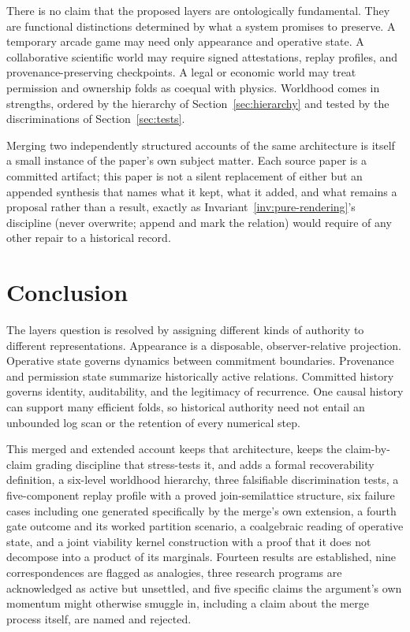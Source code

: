 \documentclass[11pt]{article}
\begin{document}
There is no claim that the proposed layers are ontologically fundamental. They are functional distinctions determined by what a system promises to preserve. A temporary arcade game may need only appearance and operative state. A collaborative scientific world may require signed attestations, replay profiles, and provenance-preserving checkpoints. A legal or economic world may treat permission and ownership folds as coequal with physics. Worldhood comes in strengths, ordered by the hierarchy of Section~\ref{sec:hierarchy} and tested by the discriminations of Section~\ref{sec:tests}.

Merging two independently structured accounts of the same architecture is itself a small instance of the paper's own subject matter. Each source paper is a committed artifact; this paper is not a silent replacement of either but an appended synthesis that names what it kept, what it added, and what remains a proposal rather than a result, exactly as Invariant~\ref{inv:pure-rendering}'s discipline (never overwrite; append and mark the relation) would require of any other repair to a historical record.

\section{Conclusion}
\label{sec:conclusion}

The layers question is resolved by assigning different kinds of authority to different representations. Appearance is a disposable, observer-relative projection. Operative state governs dynamics between commitment boundaries. Provenance and permission state summarize historically active relations. Committed history governs identity, auditability, and the legitimacy of recurrence. One causal history can support many efficient folds, so historical authority need not entail an unbounded log scan or the retention of every numerical step.

This merged and extended account keeps that architecture, keeps the claim-by-claim grading discipline that stress-tests it, and adds a formal recoverability definition, a six-level worldhood hierarchy, three falsifiable discrimination tests, a five-component replay profile with a proved join-semilattice structure, six failure cases including one generated specifically by the merge's own extension, a fourth gate outcome and its worked partition scenario, a coalgebraic reading of operative state, and a joint viability kernel construction with a proof that it does not decompose into a product of its marginals. Fourteen results are established, nine correspondences are flagged as analogies, three research programs are acknowledged as active but unsettled, and five specific claims the argument's own momentum might otherwise smuggle in, including a claim about the merge process itself, are named and rejected.
\end{document}
